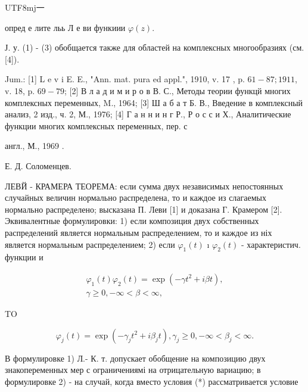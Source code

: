 \documentclass[10pt]{article}
\begin{document}
\begin{CJK}{UTF8}{mj}一\end{CJK} опред е лите льь Л е ви функиии $\varphi(z)$.



Ј. у. (1) - (3) обобщается также для областей на комплексных многообразиях (см. [4]).



Jum.: [1] L e v i E. E., "Ann. mat. pura ed appl.", 1910, v. 17 , p. $61-87 ; 1911$, v. 18, p. $69-79$; [2] В л а д и м и р о в В. С., Методы теории функцй многих комплексных переменных, M., 1964; [3] Ш а б а т Б. В., Введение в комплексный анализ, 2 изд., ч. 2, М., 1976; [4] Г а н н и н г Р., Р о с с и Х., Аналитические функции многих комплексных переменных, пер. с

англ., М., 1969 .

Е. Д. Соломенцев.



ЛЕВЙ - КРАМЕРА ТЕОРЕМА: если сумма двух независимых непостоянных случайных величин нормально распределена, то и каждое из слагаемых нормально распределено; высказана П. Леви [1] и доказана Г. Крамером [2]. Эквивалентные формулировки: 1) если композиция двух собственных распределений является нормальным распределением, то и каждое из ніх является нормальным распределением; 2) если $\varphi_{1}(t)$ ı $\varphi_{2}(t)$ - характеристич. функции и



\[

\begin{gathered}

\varphi_{1}(t) \varphi_{2}(t)=\exp \left(-\gamma t^{2}+i \beta t\right), \\

\gamma \geqslant 0,-\infty<\beta<\infty,

\end{gathered}

\]



TO



\[

\varphi_{j}(t)=\exp \left(-\gamma_{j} t^{2}+i \beta_{j} t\right), \gamma_{j} \geqslant 0,-\infty<\beta_{j}<\infty .

\]



В формулировке 1) Л.- К. т. допускает обобщение на композицию двух знакопеременных мер с ограничениямі на отрицательную вариацию; в формулировке 2) - на случай, когда вместо условия (*) рассматривается условие
\end{document}
